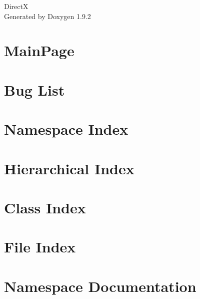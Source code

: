 \documentclass[twoside]{book}
\newcommand{\+}{\discretionary{\mbox{\scriptsize$\hookleftarrow$}}{}{}}
\newcommand{\clearemptydoublepage}{%
    \newpage{\pagestyle{empty}\cleardoublepage}%
  }
\begin{document}
  \raggedbottom
    \hypersetup{pageanchor=false,
                bookmarksnumbered=true,
                pdfencoding=unicode
               }
  \begin{titlepage}
  \vspace*{7cm}
  \begin{center}%
  {\Large DirectX}\\
  \vspace*{1cm}
  {\large Generated by Doxygen 1.9.2}\\
  \end{center}
  \end{titlepage}
  \clearemptydoublepage
  \tableofcontents
  \clearemptydoublepage
  \hypersetup{pageanchor=true}
\chapter{Main\+Page}
\label{index}\hypertarget{index}{}
\chapter{Bug List}
\label{bug}

\chapter{Namespace Index}

\chapter{Hierarchical Index}

\chapter{Class Index}

\chapter{File Index}

\chapter{Namespace Documentation}


\end{document}

